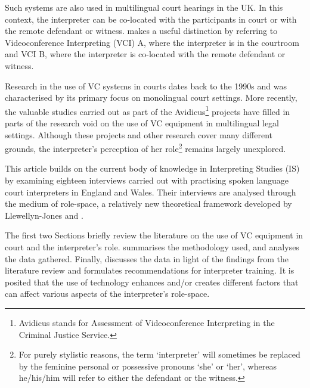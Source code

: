 \documentclass[output=paper]{langsci/langscibook}
\begin{document}
Such systems are also used in multilingual court hearings in the UK. In this context, the interpreter can be co-located with the participants in court or with the remote defendant or witness. \citet{Braun2011a} makes a useful distinction by referring to Videoconference Interpreting (VCI) A, where the interpreter is in the courtroom and VCI B, where the interpreter is co-located with the remote defendant or witness. 

Research in the use of VC systems in courts dates back to the 1990s and was characterised by its primary focus on monolingual court settings. More recently, the valuable studies carried out as part of the Avidicus\footnote{Avidicus stands for Assessment of Videoconference Interpreting in the Criminal Justice Service.}  projects have filled in parts of the research void on the use of VC equipment in multilingual legal settings. Although these projects and other research cover many different grounds, the interpreter’s perception of her role\footnote{For purely stylistic reasons, the term ‘interpreter’ will sometimes be replaced by the feminine personal or possessive pronouns ‘she’ or ‘her’, whereas he/his/him will refer to either the defendant or the witness.} remains largely unexplored. 

This article builds on the current body of knowledge in Interpreting Studies (IS) by examining eighteen interviews carried out with practising spoken language court interpreters in England and Wales. Their interviews are analysed through the medium of role-space, a relatively new theoretical framework developed by Llewellyn-Jones and \citet{Lee2014}.

The first two Sections briefly review the literature on the use of VC equipment in court and the interpreter’s role.  summarises the methodology used, and  analyses the data gathered. Finally,  discusses the data in light of the findings from the literature review and formulates recommendations for interpreter training. It is posited that the use of technology enhances and/or creates different factors that can affect various aspects of the interpreter’s role-space.  
\end{document}
